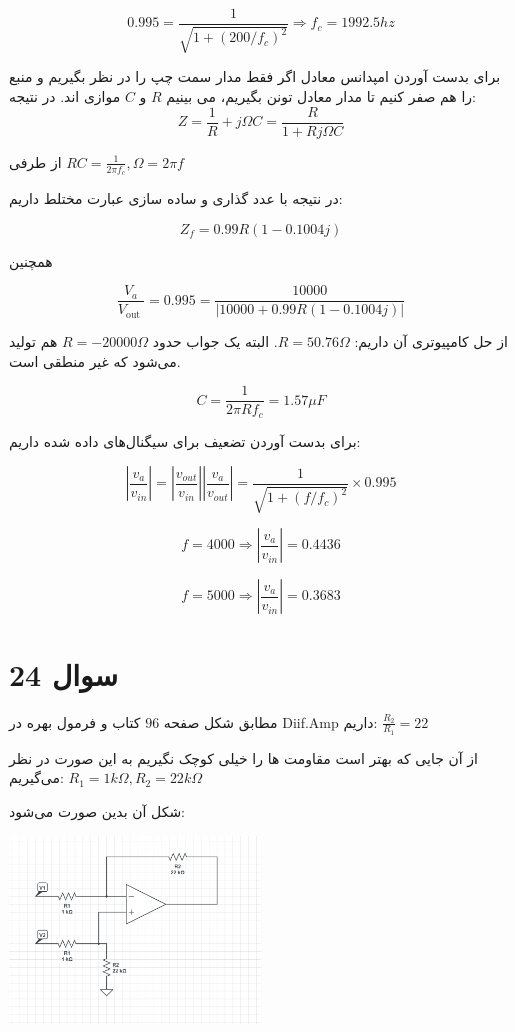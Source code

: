 \documentclass[12pt]{article}
\begin{document}
$$
0.995=\frac{1}{\sqrt{1+\left(200 / f_{c}\right)^{2}}} \Rightarrow f_c = 1992.5 hz
$$

برای بدست آوردن امپدانس معادل اگر فقط مدار سمت چپ را در نظر بگیریم و منبع را هم صفر کنیم تا مدار معادل تونن بگیریم، می بینیم $R$ و $C$ موازی اند. در نتیجه:
$$Z = \frac{1}{R} + j\Omega C = \frac{R}{1 + Rj\Omega C}$$

از طرفی
$RC = \frac{1}{2 \pi f_c} , \Omega = 2 \pi f$

در نتیجه با عدد گذاری و ساده سازی عبارت مختلط داریم:

$$
Z_{f}=0.99 R(1-0.1004 j)
$$

همچنین

$$
\frac{V_{a}}{V_{\text {out }}}=0.995=\frac{10000}{|10000+0.99 R(1-0.1004 j)|}
$$


از حل کامپیوتری آن داریم:
$R = 50.76 \Omega$.
البته یک جواب حدود $R=-20000 \Omega$ هم تولید می‌شود که غیر منطقی است.

$$C = \frac{1}{ 2 \pi R f_c} = 1.57 \mu F$$

برای بدست آوردن تضعیف برای سیگنال‌های داده شده داریم:

$$|\frac{v_a}{v_{in}}| = |\frac{v_{out}}{v_{in}}| |\frac{v_a}{v_{out}}| = \frac{1}{\sqrt{1+\left(f / f_{c}\right)^{2}}} \times 0.995 $$

$$f = 4000 \Rightarrow |\frac{v_a}{v_{in}}| = 0.4436$$

$$f = 5000 \Rightarrow |\frac{v_a}{v_{in}}| = 0.3683$$

\newpage

\section*{سوال 24}

مطابق شکل صفحه $96$ کتاب و فرمول بهره در Diif.Amp داریم:
$\frac{R_2}{R_1} = 22 $

از آن جایی که بهتر است مقاومت ها را خیلی کوچک نگیریم به این صورت در نظر می‌گیریم:
$R_1 = 1 k\Omega , R_2 = 22 k \Omega$

شکل آن بدین صورت می‌شود:


\begin{center}
	\includegraphics[width = 0.5\textwidth]{images/5.png}
\end{center}
\end{document}
